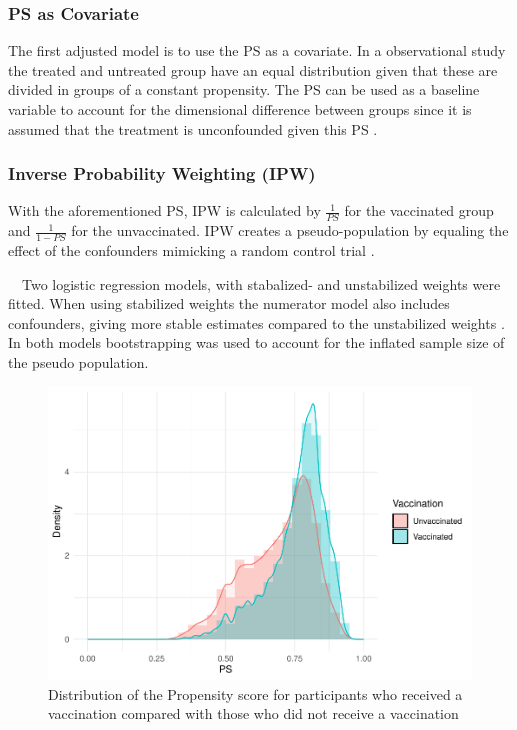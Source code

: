 \documentclass[
]{article}
\begin{document}
\hypertarget{ps-as-covariate}{%
\subsubsection{PS as Covariate}\label{ps-as-covariate}}

The first adjusted model is to use the PS as a covariate. In a observational study the treated and untreated group have an equal distribution given that these are divided in groups of a constant propensity. The PS can be used as a baseline variable to account for the dimensional difference between groups since it is assumed that the treatment is unconfounded given this PS \citep{schafer}.

\hypertarget{inverse-probability-weighting-ipw}{%
\subsubsection{Inverse Probability Weighting (IPW)}\label{inverse-probability-weighting-ipw}}

With the aforementioned PS, IPW is calculated by \(\frac{1}{PS}\) for the vaccinated group and \(\frac{1}{1-PS}\) for the unvaccinated. IPW creates a pseudo-population by equaling the effect of the confounders mimicking a random control trial \citep{shiba}.

~~Two logistic regression models, with stabalized- and unstabilized weights were fitted. When using stabilized weights the numerator model also includes confounders, giving more stable estimates compared to the unstabilized weights \citep{ipw}. In both models bootstrapping was used to account for the inflated sample size of the pseudo population.

\begin{figure}
\includegraphics[width=0.7\linewidth]{Assignment_files/figure-latex/psscore-1} \caption{Distribution of the Propensity score for participants who received a vaccination compared with those who did not receive a vaccination}\label{fig:psscore}
\end{figure}
\end{document}
